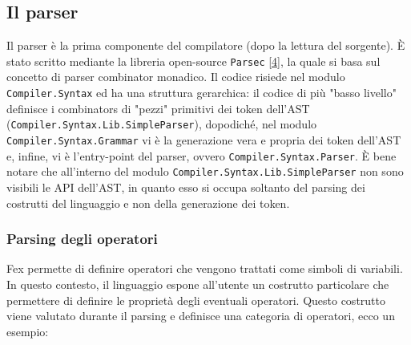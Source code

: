 \documentclass[10pt,a4paper]{article}
\begin{document}

\hypertarget{Il parser}{\subsection{Il parser}}
Il parser è la prima componente del compilatore (dopo la lettura del sorgente). \`E stato scritto mediante la libreria
open-source \texttt{Parsec} \hyperlink{bibl4}{[4]}, la quale si basa sul concetto di parser combinator monadico.
Il codice risiede nel
modulo \texttt{Compiler.Syntax} ed ha una struttura gerarchica: il codice di più "basso livello" definisce i combinators
di "pezzi" primitivi dei
token dell'AST (\texttt{Compiler.Syntax.Lib.SimpleParser}), dopodiché, nel modulo \texttt{Compiler.Syntax.Grammar} vi
è la generazione vera e propria dei token dell'AST e, infine, vi è l'entry-point del parser, ovvero
\texttt{Compiler.Syntax.Parser}. \`E bene notare che all'interno del modulo \texttt{Compiler.Syntax.Lib.SimpleParser}
non sono visibili le API dell'AST, in quanto esso si occupa soltanto del parsing dei costrutti del linguaggio e non
della generazione dei token.

\hypertarget{Parsing degli operatori}{\subsubsection{Parsing degli operatori}}
Fex permette di definire operatori che vengono trattati come simboli di variabili. In questo contesto,
il linguaggio espone all'utente un costrutto particolare che permettere di definire le proprietà degli eventuali
operatori. Questo costrutto viene valutato durante il parsing e definisce una categoria di operatori, ecco un esempio:
\end{document}
